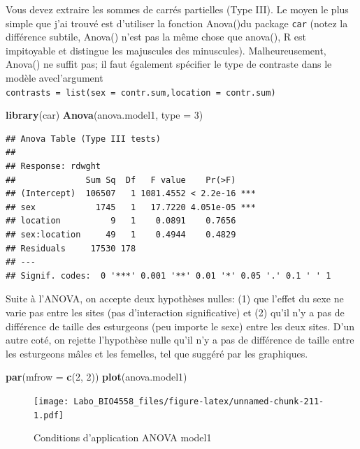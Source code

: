 \documentclass[
  12pt,
]{book}
\newenvironment{Shaded}{\begin{snugshade}}{\end{snugshade}}
\newcommand{\DataTypeTok}[1]{\textcolor[rgb]{0.13,0.29,0.53}{#1}}
\newcommand{\DecValTok}[1]{\textcolor[rgb]{0.00,0.00,0.81}{#1}}
\newcommand{\KeywordTok}[1]{\textcolor[rgb]{0.13,0.29,0.53}{\textbf{#1}}}
\newcommand{\NormalTok}[1]{#1}
\begin{document}
Vous devez extraire les sommes de carrés partielles (Type III). Le moyen le plus simple que j'ai trouvé est d'utiliser la fonction Anova()du package \texttt{car} (notez la différence subtile, Anova() n'est pas la même chose que anova(), R est impitoyable et distingue les majuscules des minuscules). Malheureusement, Anova() ne suffit pas; il faut également spécifier le type de contraste dans le modèle avecl'argument \texttt{contrasts\ =\ list(sex\ =\ contr.sum,location\ =\ contr.sum)}

\begin{Shaded}
\begin{Highlighting}[]
\KeywordTok{library}\NormalTok{(car)}
\KeywordTok{Anova}\NormalTok{(anova.model1, }\DataTypeTok{type =} \DecValTok{3}\NormalTok{)}
\end{Highlighting}
\end{Shaded}

\begin{verbatim}
## Anova Table (Type III tests)
## 
## Response: rdwght
##              Sum Sq  Df   F value    Pr(>F)    
## (Intercept)  106507   1 1081.4552 < 2.2e-16 ***
## sex            1745   1   17.7220 4.051e-05 ***
## location          9   1    0.0891    0.7656    
## sex:location     49   1    0.4944    0.4829    
## Residuals     17530 178                        
## ---
## Signif. codes:  0 '***' 0.001 '**' 0.01 '*' 0.05 '.' 0.1 ' ' 1
\end{verbatim}

Suite à l'ANOVA, on accepte deux hypothèses nulles: (1) que l'effet du sexe ne varie pas entre les sites (pas d'interaction significative) et (2) qu'il n'y a pas de différence de taille des esturgeons (peu importe le sexe) entre les deux sites. D'un autre coté, on rejette l'hypothèse nulle qu'il n'y a pas de différence de taille entre les esturgeons mâles et les femelles, tel que suggéré par les graphiques.

\begin{Shaded}
\begin{Highlighting}[]
\KeywordTok{par}\NormalTok{(}\DataTypeTok{mfrow =} \KeywordTok{c}\NormalTok{(}\DecValTok{2}\NormalTok{, }\DecValTok{2}\NormalTok{))}
\KeywordTok{plot}\NormalTok{(anova.model1)}
\end{Highlighting}
\end{Shaded}

\begin{figure}
\centering
\texttt{[image: Labo\_BIO4558\_files/figure-latex/unnamed-chunk-211-1.pdf]}
\caption{\label{fig:unnamed-chunk-211}Conditions d'application ANOVA model1}
\end{figure}
\end{document}
